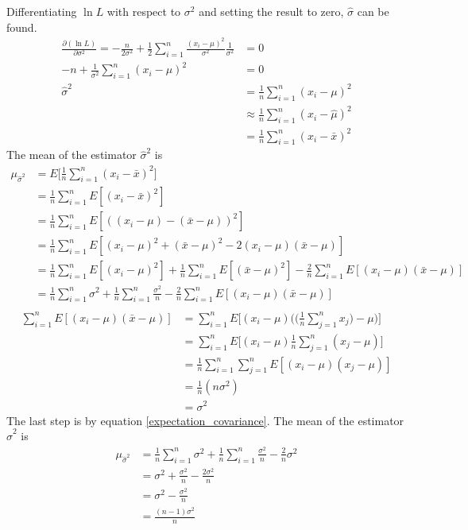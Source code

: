 \documentclass[12pt,a4paper]{report}
\begin{document}
Differentiating $\ln L$ with respect to $\sigma^2$ and setting the result to zero, $\hat{\sigma}$ can be found.
\begin{align*}
\frac{\partial ( \ln L )}{\partial \sigma^2} =
-\frac{n}{2 \sigma^2} + \frac{1}{2} \sum_{i = 1}^{n} \frac{(x_i - \mu)^2}{\sigma^2} \frac{1}{\sigma^2} &= 0 \\
-n + \frac{1}{\sigma^2} \sum_{i = 1}^{n} (x_i - \mu)^2 &= 0 \\
\hat{\sigma}^2 &= \frac{1}{n} \sum_{i = 1}^{n} (x_i - \mu)^2 \\
&\approx \frac{1}{n} \sum_{i = 1}^{n} (x_i - \hat{\mu})^2 \\
&= \frac{1}{n} \sum_{i = 1}^{n} (x_i - \bar{x})^2
\end{align*}
The mean of the estimator $\hat{\sigma}^2$ is
\begin{align*}
\mu_{\hat{\sigma}^2}
&= E \Bigg[ \frac{1}{n} \sum_{i = 1}^{n} (x_i - \bar{x})^2 \Bigg] \\
&= \frac{1}{n} \sum_{i = 1}^{n} E [(x_i - \bar{x})^2] \\
&= \frac{1}{n} \sum_{i = 1}^{n} E [((x_i - \mu) - (\bar{x} - \mu))^2] \\
&= \frac{1}{n} \sum_{i = 1}^{n} E [(x_i - \mu)^2 + (\bar{x} - \mu)^2 - 2 (x_i - \mu)(\bar{x} - \mu)] \\
&= \frac{1}{n} \sum_{i = 1}^{n} E [(x_i - \mu)^2]
+ \frac{1}{n} \sum_{i = 1}^{n} E [(\bar{x} - \mu)^2]
- \frac{2}{n} \sum_{i = 1}^{n} E [(x_i - \mu)(\bar{x} - \mu)] \\
&= \frac{1}{n} \sum_{i = 1}^{n} \sigma^2
+ \frac{1}{n} \sum_{i = 1}^{n} \frac{\sigma^2}{n}
- \frac{2}{n} \sum_{i = 1}^{n} E [(x_i - \mu)(\bar{x} - \mu)] \\
\end{align*}
\begin{align*}
\sum_{i = 1}^{n} E [(x_i - \mu)(\bar{x} - \mu)]
&= \sum_{i = 1}^{n} E \Bigg[ (x_i - \mu) \Bigg( \Bigg( \frac{1}{n} \sum_{j = 1}^{n} x_j \Bigg) - \mu \Bigg) \Bigg] \\
&= \sum_{i = 1}^{n} E \Bigg[ (x_i - \mu) \frac{1}{n} \sum_{j = 1}^{n} (x_j - \mu) \Bigg] \\
&= \frac{1}{n}\sum_{i = 1}^{n} \sum_{j = 1}^{n} E[ (x_i - \mu) (x_j - \mu) ] \\
&= \frac{1}{n} (n \sigma^2) \\
&= \sigma^2
\end{align*}
The last step is by equation \ref{expectation_covariance}. The mean of the estimator $\hat{\sigma}^2$ is
\begin{align*}
\mu_{\hat{\sigma}^2}
&= \frac{1}{n} \sum_{i = 1}^{n} \sigma^2
+  \frac{1}{n} \sum_{i = 1}^{n} \frac{\sigma^2}{n}
-  \frac{2}{n} \sigma^2 \\
&= \sigma^2
+  \frac{\sigma^2}{n}
-  \frac{2\sigma^2}{n} \\
&= \sigma^2 - \frac{\sigma^2}{n} \\
&= \frac{(n-1)\sigma^2}{n} \\
\end{align*}
\end{document}
